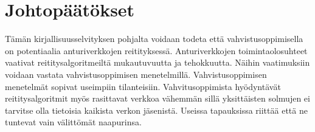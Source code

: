 \section{Johtopäätökset}
Tämän kirjallisuusselvityksen pohjalta voidaan todeta että vahvistusoppimisella
on potentiaalia anturiverkkojen reitityksessä. Anturiverkkojen
toimintaolosuhteet vaativat reititysalgoritmeiltä mukautuvuutta ja tehokkuutta.
Näihin vaatimuksiin voidaan vastata vahvistusoppimisen menetelmillä.
Vahvistusoppimisen menetelmät sopivat useimpiin tilanteisiin. Vahvitusoppimista
hyödyntävät reititysalgoritmit myös rasittavat verkkoa vähemmän sillä
yksittäisten solmujen ei tarvitse olla tietoisia kaikista verkon jäsenistä.
Useissa tapauksissa riittää että ne tuntevat vain välittömät naapurinsa.
